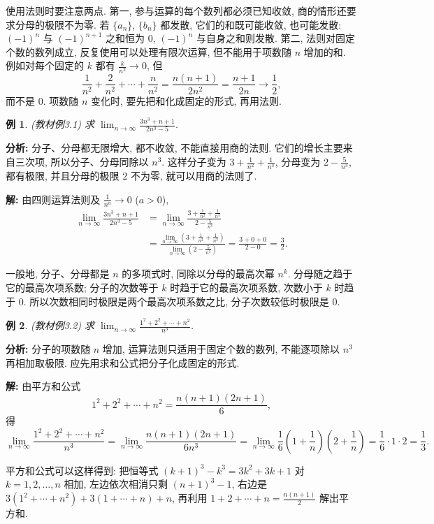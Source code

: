 \documentclass[UTF8,openany]{ctexbook}
\theoremstyle{chinesetextbook}
\newtheorem{example}{例}[section]
\newenvironment{cnsolution}{\par\indent\textbf{解:} \ignorespaces}{\par}
\begin{document}
使用法则时要注意两点. 第一, 参与运算的每个数列都必须已知收敛, 商的情形还要求分母的极限不为零. 若 $\{a_n\}$, $\{b_n\}$ 都发散, 它们的和既可能收敛, 也可能发散: $(-1)^n$ 与 $(-1)^{n+1}$ 之和恒为 $0$, $(-1)^n$ 与自身之和则发散. 第二, 法则对固定个数的数列成立, 反复使用可以处理有限次运算, 但不能用于项数随 $n$ 增加的和. 例如对每个固定的 $k$ 都有 $\displaystyle\frac k{n^2}\to0$, 但
\[
\frac1{n^2}+\frac2{n^2}+\cdots+\frac n{n^2}=\frac{n(n+1)}{2n^2}=\frac{n+1}{2n}\to\frac12,
\]
而不是 $0$. 项数随 $n$ 变化时, 要先把和化成固定的形式, 再用法则.
\begin{example}
\textnormal{(教材例3.1)} 求 $\displaystyle\lim_{n\to\infty}\frac{3n^3+n+1}{2n^3-5}$.
\end{example}
\par\indent\textbf{分析:} 分子、分母都无限增大, 都不收敛, 不能直接用商的法则. 它们的增长主要来自三次项, 所以分子、分母同除以 $n^3$. 这样分子变为 $\displaystyle3+\frac1{n^2}+\frac1{n^3}$, 分母变为 $\displaystyle2-\frac5{n^3}$, 都有极限, 并且分母的极限 $2$ 不为零, 就可以用商的法则了.
\begin{cnsolution}
由四则运算法则及 $\displaystyle\frac1{n^a}\to0$ ($a>0$),
\[
\begin{aligned}
\lim_{n\to\infty}\frac{3n^3+n+1}{2n^3-5}
&=\lim_{n\to\infty}\frac{3+\frac1{n^2}+\frac1{n^3}}{2-\frac5{n^3}}\\
&=\frac{\displaystyle\lim_{n\to\infty}\left(3+\frac1{n^2}+\frac1{n^3}\right)}{\displaystyle\lim_{n\to\infty}\left(2-\frac5{n^3}\right)}
=\frac{3+0+0}{2-0}=\frac32.
\end{aligned}
\]
\end{cnsolution}
一般地, 分子、分母都是 $n$ 的多项式时, 同除以分母的最高次幂 $n^k$. 分母随之趋于它的最高次项系数; 分子的次数等于 $k$ 时趋于它的最高次项系数, 次数小于 $k$ 时趋于 $0$. 所以次数相同时极限是两个最高次项系数之比, 分子次数较低时极限是 $0$.
\begin{example}
\textnormal{(教材例3.2)} 求 $\displaystyle\lim_{n\to\infty}\frac{1^2+2^2+\cdots+n^2}{n^3}$.
\end{example}
\par\indent\textbf{分析:} 分子的项数随 $n$ 增加, 运算法则只适用于固定个数的数列, 不能逐项除以 $n^3$ 再相加取极限. 应先用求和公式把分子化成固定的形式.
\begin{cnsolution}
由平方和公式
\[
1^2+2^2+\cdots+n^2=\frac{n(n+1)(2n+1)}6,
\]
得
\[
\lim_{n\to\infty}\frac{1^2+2^2+\cdots+n^2}{n^3}
=\lim_{n\to\infty}\frac{n(n+1)(2n+1)}{6n^3}
=\lim_{n\to\infty}\frac16\left(1+\frac1n\right)\left(2+\frac1n\right)
=\frac16\cdot1\cdot2=\frac13.
\]
\end{cnsolution}
平方和公式可以这样得到: 把恒等式 $(k+1)^3-k^3=3k^2+3k+1$ 对 $k=1,2,\ldots,n$ 相加, 左边依次相消只剩 $(n+1)^3-1$, 右边是 $3(1^2+\cdots+n^2)+3(1+\cdots+n)+n$, 再利用 $\displaystyle1+2+\cdots+n=\frac{n(n+1)}2$ 解出平方和.
\end{document}
